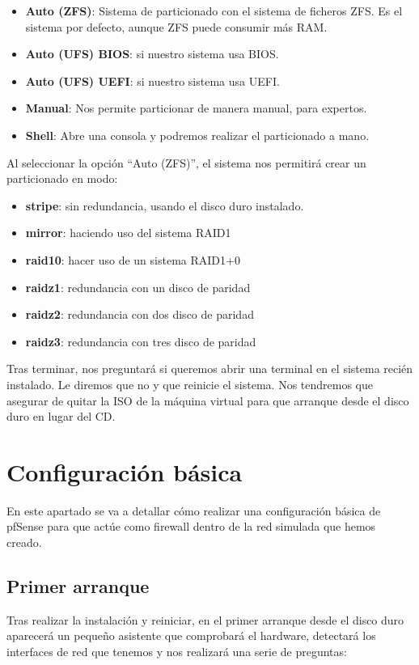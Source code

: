 \begin{itemize}
    \item \textbf{Auto (ZFS)}: Sistema de particionado con el sistema de ficheros ZFS. Es el sistema por defecto, aunque ZFS puede consumir más RAM.
    \item \textbf{Auto (UFS) BIOS}: si nuestro sistema usa BIOS.
    \item \textbf{Auto (UFS) UEFI}: si nuestro sistema usa UEFI.
    \item \textbf{Manual}: Nos permite particionar de manera manual, para expertos.
    \item \textbf{Shell}: Abre una consola y podremos realizar el particionado a mano.

\end{itemize}

Al seleccionar la opción “Auto (ZFS)”, el sistema nos permitirá crear un particionado en modo:
\begin{itemize}
    \item \textbf{stripe}: sin redundancia, usando el disco duro instalado.
    \item \textbf{mirror}: haciendo uso del sistema RAID1
    \item \textbf{raid10}: hacer uso de un sistema RAID1+0
    \item \textbf{raidz1}: redundancia con un disco de paridad
    \item \textbf{raidz2}: redundancia con dos disco de paridad
    \item \textbf{raidz3}: redundancia con tres disco de paridad
\end{itemize}

Tras terminar, nos preguntará si queremos abrir una terminal en el sistema recién instalado. Le diremos que no y que reinicie el sistema. Nos tendremos que asegurar de quitar la ISO de la máquina virtual para que arranque desde el disco duro en lugar del CD.


\chapter{Configuración básica}
En este apartado se va a detallar cómo realizar una configuración básica de pfSense para que actúe como firewall dentro de la red simulada que hemos creado.


\section{Primer arranque}
Tras realizar la instalación y reiniciar, en el primer arranque desde el disco duro aparecerá un pequeño asistente que comprobará el hardware, detectará los interfaces de red que tenemos y nos realizará una serie de preguntas:


